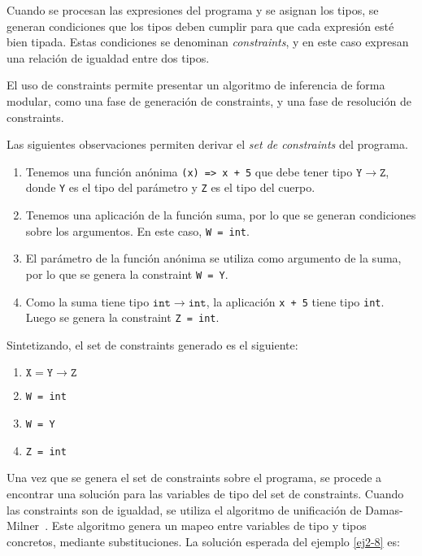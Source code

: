 Cuando se procesan las expresiones del programa y se asignan los tipos, se generan condiciones que los tipos deben cumplir para que cada expresión esté bien tipada. Estas condiciones se denominan \emph{constraints}, y en este caso expresan una relación de igualdad entre dos tipos.

El uso de constraints permite presentar un algoritmo de inferencia de forma modular, como una fase de generación de constraints, y una fase de resolución de constraints.

Las siguientes observaciones permiten derivar el \emph{set de constraints} del programa.

\begin{enumerate}
  \item Tenemos una función anónima \texttt{(x) =>\ x + 5} que debe tener tipo $\mathtt{Y \rightarrow Z}$, donde \texttt{Y} es el tipo del parámetro y \texttt{Z} es el tipo del cuerpo.
  \item Tenemos una aplicación de la función suma, por lo que se generan condiciones sobre los argumentos. En este caso, \texttt{W = int}.
  \item El parámetro de la función anónima se utiliza como argumento de la suma, por lo que se genera la constraint \texttt{W = Y}.
  \item Como la suma tiene tipo $\mathtt{int \rightarrow int}$, la aplicación \texttt{x + 5} tiene tipo \texttt{int}. Luego se genera la constraint \texttt{Z = int}.
\end{enumerate}

Sintetizando, el set de constraints generado es el siguiente:

\begin{enumerate}
  \item $\mathtt{X = Y \rightarrow Z}$
  \item \texttt{W = int}
  \item \texttt{W = Y}
  \item \texttt{Z = int}
\end{enumerate}

Una vez que se genera el set de constraints sobre el programa, se procede a encontrar una solución para las variables de tipo del set de constraints. Cuando las constraints son de igualdad, se utiliza el algoritmo de unificación de Damas-Milner~\cite{damasmilner}. Este algoritmo genera un mapeo entre variables de tipo y tipos concretos, mediante substituciones. La solución esperada del ejemplo \ref{ej2-8} es:

